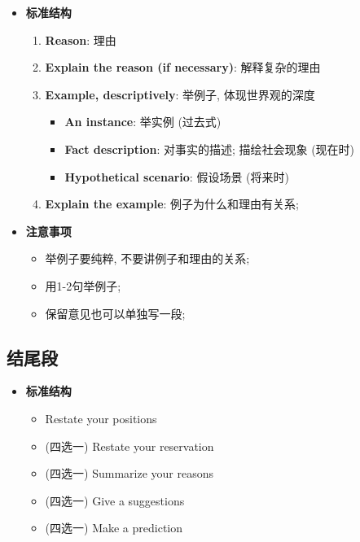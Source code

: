     \begin{itemize}
      \item \textbf{标准结构}
      \begin{enumerate}
        \item \textbf{Reason}: 理由
        \item \textbf{Explain the reason (if necessary)}: 解释复杂的理由
        \item \textbf{Example, descriptively}: 举例子, 体现世界观的深度
        \begin{itemize}
          \item \textbf{An instance}: 举实例 (过去式)
          \item \textbf{Fact description}: 对事实的描述; 描绘社会现象 (现在时)
          \item \textbf{Hypothetical scenario}: 假设场景 (将来时)
        \end{itemize}

        \item \textbf{Explain the example}: 例子为什么和理由有关系;
      \end{enumerate}

      \item \textbf{注意事项}
      \begin{itemize}
        \item 举例子要纯粹, 不要讲例子和理由的关系;
        \item 用1-2句举例子;
        \item 保留意见也可以单独写一段;
      \end{itemize}
    \end{itemize}

  \subsection{结尾段}

    \begin{itemize}
      \item \textbf{标准结构}
      \begin{itemize}
        \item Restate your positions
        \item (四选一) Restate your reservation
        \item (四选一) Summarize your reasons
        \item (四选一) Give a suggestions
        \item (四选一) Make a prediction
      \end{itemize}
    \end{itemize}

